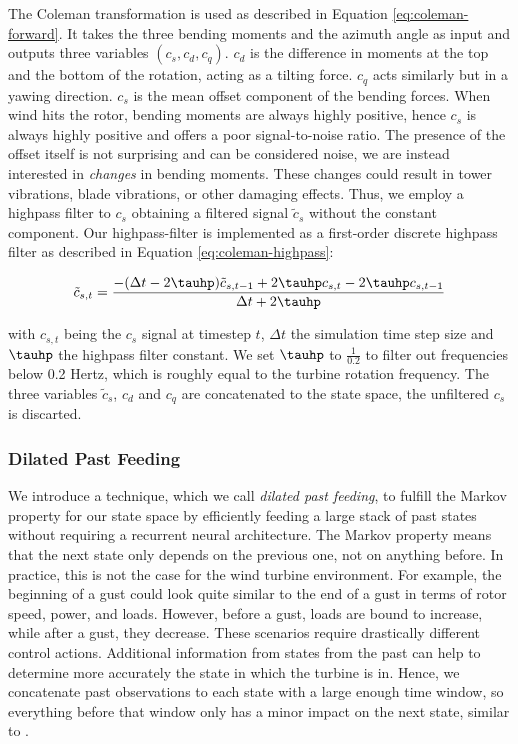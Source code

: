 The Coleman transformation is used as described in Equation \ref{eq:coleman-forward}. It takes the three bending moments and the azimuth angle as input and outputs three variables $(c_s, c_d, c_q)$. $c_d$ is the difference in moments at the top and the bottom of the rotation, acting as a tilting force. $c_q$ acts similarly but in a yawing direction. $c_s$ is the mean offset component of the bending forces. When wind hits the rotor, bending moments are always highly positive, hence $c_s$ is always highly positive and offers a poor signal-to-noise ratio. The presence of the offset itself is not surprising and can be considered noise, we are instead interested in \textit{changes} in bending moments. These changes could result in tower vibrations, blade vibrations, or other damaging effects. Thus, we employ a highpass filter to $c_s$ obtaining a filtered signal $\tilde c_s$ without the constant component. Our highpass-filter is implemented as a first-order discrete highpass filter as described in Equation \ref{eq:coleman-highpass}:

\begin{equation}
  \tilde c_{s,t} = \frac{-(\Delta t - 2 \tauhp )\tilde c_{s, t-1} + 2\tauhp c_{s,t} - 2\tauhp c_{s, t-1}}{ \Delta t + 2\tauhp }
  \label{eq:coleman-highpass}
\end{equation}

with $c_{s, t}$ being the $c_s$ signal at timestep $t$, $\Delta t$ the simulation time step size and $\tauhp$ the highpass filter constant. We set $\tauhp$ to $\frac{1}{0.2}$ to filter out frequencies below 0.2 Hertz, which is roughly equal to the turbine rotation frequency. The three variables $\tilde c_s$, $c_d$ and $c_q$ are concatenated to the state space, the unfiltered $c_s$ is discarted.

\subsubsection{Dilated Past Feeding}

We introduce a technique, which we call \textit{dilated past feeding}, to fulfill the Markov property for our state space by efficiently feeding a large stack of past states without requiring a recurrent neural architecture. The Markov property means that the next state only depends on the previous one, not on anything before. In practice, this is not the case for the wind turbine environment. For example, the beginning of a gust could look quite similar to the end of a gust in terms of rotor speed, power, and loads. However, before a gust, loads are bound to increase, while after a gust, they decrease. These scenarios require drastically different control actions. Additional information from states from the past can help to determine more accurately the state in which the turbine is in. Hence, we concatenate past observations to each state with a large enough time window, so everything before that window only has a minor impact on the next state, similar to \citet{mnihPlayingAtariDeep2013}. 

